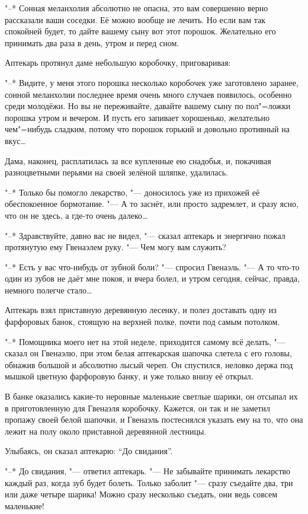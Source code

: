 "--* Сонная меланхолия абсолютно не опасна, это вам совершенно верно рассказали
ваши соседки.
Её можно вообще не лечить.
Но если вам так спокойней будет, то дайте вашему сыну вот этот порошок.
Желательно его принимать два раза в день, утром и перед сном.

Аптекарь протянул даме небольшую коробочку, приговаривая:

"--* Видите, у меня этого порошка несколько коробочек уже заготовлено заранее,
сонной меланхолии последнее время очень много случаев появилось, особенно среди
молодёжи.
Но вы не переживайте, давайте вашему сыну по пол"=ложки порошка утром и
вечером.
И пусть его запивает хорошенько, желательно чем"=нибудь сладким, потому что
порошок горький и довольно противный на вкус\ldots

Дама, наконец, расплатилась за все купленные ею снадобья, и, покачивая
разноцветными перьями на своей зелёной шляпке, удалилась.

"--* Только бы помогло лекарство, "--- доносилось уже из прихожей её
обеспокоенное бормотание.
"--- А то заснёт, или просто задремлет, и сразу ясно, что он не здесь, а где-то
очень далеко\ldots

"--* Здравствуйте, давно вас не видел, "--- сказал аптекарь и энергично пожал
протянутую ему Гвенаэлем руку.
"--- Чем могу вам служить?

"--* Есть у вас что-нибудь от зубной боли? "--- спросил Гвенаэль.
"--- А то что-то один из зубов не даёт мне покоя, и вчера болел, и утром сегодня,
сейчас, правда, немного полегче стало\ldots

Аптекарь взял приставную деревянную лесенку, и полез доставать одну из
фарфоровых банок, стоящую на верхней полке, почти под самым потолком.

"--* Помощника моего нет на этой неделе, приходится самому всё делать, "---
сказал он Гвенаэлю, при этом белая аптекарская шапочка слетела с его головы,
обнажив большой и абсолютно лысый череп.
Он спустился, неловко держа под мышкой цветную фарфоровую банку, и уже только
внизу её открыл.

В банке оказались какие-то неровные маленькие светлые шарики, он отсыпал их в
приготовленную для Гвенаэля коробочку.
Кажется, он так и не заметил пропажу своей белой шапочки, и Гвенаэль постеснялся
указать ему на то, что она лежит на полу около приставной деревянной лестницы.

Улыбаясь, он сказал аптекарю: \enquote{До свидания}.

"--* До свидания, "--- ответил аптекарь.
"--- Не забывайте принимать лекарство каждый раз, когда зуб будет болеть.
Только заболит "--- сразу съедайте два, три или даже четыре шарика!
Можно сразу несколько съедать, они ведь совсем маленькие!

